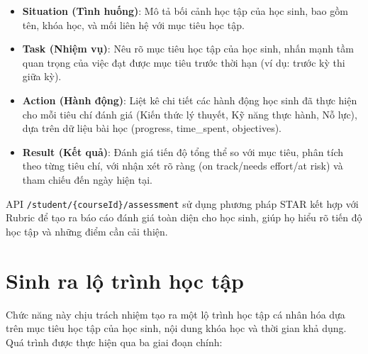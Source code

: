 \begin{itemize}
    \item \textbf{Situation (Tình huống)}: Mô tả bối cảnh học tập của học sinh, bao gồm tên, khóa học, và mối liên hệ với mục tiêu học tập.
    
    \item \textbf{Task (Nhiệm vụ)}: Nêu rõ mục tiêu học tập của học sinh, nhấn mạnh tầm quan trọng của việc đạt được mục tiêu trước thời hạn (ví dụ: trước kỳ thi giữa kỳ).
    
    \item \textbf{Action (Hành động)}: Liệt kê chi tiết các hành động học sinh đã thực hiện cho mỗi tiêu chí đánh giá (Kiến thức lý thuyết, Kỹ năng thực hành, Nỗ lực), dựa trên dữ liệu bài học (progress, time\_spent, objectives).
    
    \item \textbf{Result (Kết quả)}: Đánh giá tiến độ tổng thể so với mục tiêu, phân tích theo từng tiêu chí, với nhận xét rõ ràng (on track/needs effort/at risk) và tham chiếu đến ngày hiện tại.
\end{itemize}

API \texttt{/student/\{courseId\}/assessment} sử dụng phương pháp STAR kết hợp với Rubric để tạo ra báo cáo đánh giá toàn diện cho học sinh, giúp họ hiểu rõ tiến độ học tập và những điểm cần cải thiện.

\section{Sinh ra lộ trình học tập}
Chức năng này chịu trách nhiệm tạo ra một lộ trình học tập cá nhân hóa dựa trên mục tiêu học tập của học sinh, nội dung khóa học và thời gian khả dụng. Quá trình được thực hiện qua ba giai đoạn chính:

